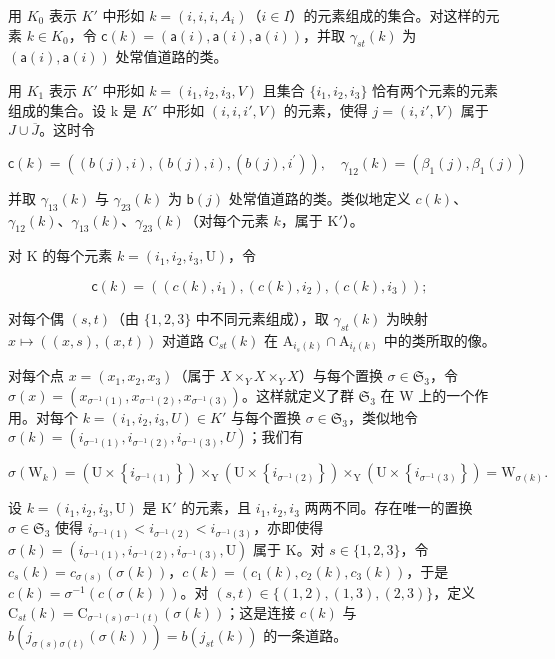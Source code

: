 用 \(K_{0}\) 表示 \(K'\) 中形如 \(k = (i, i, i, A_{i})\)（\(i \in I\)）的元素组成的集合。对这样的元素 \(k \in K_{0}\)，令 \(\mathsf{c}(k) = (\mathsf{a}(i), \mathsf{a}(i), \mathsf{a}(i))\)，并取 \(\gamma_{st}(k)\) 为 \((\mathsf{a}(i), \mathsf{a}(i))\) 处常值道路的类。

用 \(K_{1}\) 表示 \(K'\) 中形如 \(k = (i_{1}, i_{2}, i_{3}, V)\) 且集合 \(\{i_{1}, i_{2}, i_{3}\}\) 恰有两个元素的元素组成的集合。设 k 是 \(K'\) 中形如 \((i, i, i', V)\) 的元素，使得 \(j = (i, i', V)\) 属于 \(J \cup \overline{J}\)。这时令

\[
\mathsf {c} (k) = ((b (j), i), (b (j), i), (b (j), i ^ {\prime})), \quad \gamma_ {1 2} (k) = (\beta_ {1} (j), \beta_ {1} (j))
\]

并取 \(\gamma_{13}(k)\) 与 \(\gamma_{23}(k)\) 为 \(\mathsf{b}(j)\) 处常值道路的类。类似地定义 \(c(k)\)、\(\gamma_{12}(k)\)、\(\gamma_{13}(k)\)、\(\gamma_{23}(k)\)（对每个元素 \(k\)，属于 \(\mathrm{K}'\)）。

对 K 的每个元素 \(k = (i_{1}, i_{2}, i_{3}, \mathrm{U})\)，令

\[
\mathsf {c} (k) = ((c (k), i _ {1}), (c (k), i _ {2}), (c (k), i _ {3})) ;
\]

对每个偶 \((s,t)\)（由 \(\{1,2,3\}\) 中不同元素组成），取 \(\gamma_{st}(k)\) 为映射 \(x\mapsto((x,s),(x,t))\) 对道路 \(\mathrm{C}_{st}(k)\) 在 \(\mathrm{A}_{i_{s}(k)}\cap\mathrm{A}_{i_{t}(k)}\) 中的类所取的像。

对每个点 \(x = (x_1, x_2, x_3)\)（属于 \(X \times_Y X \times_Y X\)）与每个置换 \(\sigma \in \mathfrak{S}_3\)，令 \(\sigma(x) = (x_{\sigma^{-1}(1)}, x_{\sigma^{-1}(2)}, x_{\sigma^{-1}(3)})\)。这样就定义了群 \(\mathfrak{S}_3\) 在 W 上的一个作用。对每个 \(k = (i_1, i_2, i_3, U) \in K'\) 与每个置换 \(\sigma \in \mathfrak{S}_3\)，类似地令 \(\sigma(k) = (i_{\sigma^{-1}(1)}, i_{\sigma^{-1}(2)}, i_{\sigma^{-1}(3)}, U)\)；我们有

\[
\sigma \left(\mathrm{W} _ {k}\right) = \left(\mathrm{U} \times \left\{i _ {\sigma^ {- 1} (1)} \right\}\right) \times_ {\mathrm{Y}} \left(\mathrm{U} \times \left\{i _ {\sigma^ {- 1} (2)} \right\}\right) \times_ {\mathrm{Y}} \left(\mathrm{U} \times \left\{i _ {\sigma^ {- 1} (3)} \right\}\right) = \mathrm{W} _ {\sigma (k)}.
\]

设 \(k = (i_1, i_2, i_3, \mathrm{U})\) 是 \(\mathrm{K}'\) 的元素，且 \(i_1, i_2, i_3\) 两两不同。存在唯一的置换 \(\sigma \in \mathfrak{S}_3\) 使得 \(i_{\sigma^{-1}(1)} < i_{\sigma^{-1}(2)} < i_{\sigma^{-1}(3)}\)，亦即使得 \(\sigma(k) = (i_{\sigma^{-1}(1)}, i_{\sigma^{-1}(2)}, i_{\sigma^{-1}(3)}, \mathrm{U})\) 属于 \(\mathrm{K}\)。对 \(s \in \{1, 2, 3\}\)，令 \(c_s(k) = c_{\sigma(s)}(\sigma(k))\)，\(c(k) = (c_1(k), c_2(k), c_3(k))\)，于是 \(c(k) = \sigma^{-1}(c(\sigma(k)))\)。对 \((s, t) \in \{(1, 2), (1, 3), (2, 3)\}\)，定义 \(\mathrm{C}_{st}(k) = \mathrm{C}_{\sigma^{-1}(s)\sigma^{-1}(t)}(\sigma(k))\)；这是连接 \(c(k)\) 与 \(b(j_{\sigma(s)\sigma(t)}(\sigma(k))) = b(j_{st}(k))\) 的一条道路。

